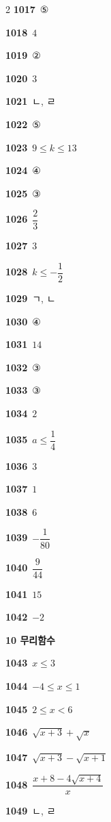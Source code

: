 \documentclass[10pt,a4paper]{article}
\begin{document}
\begin{multicols}{2}
\noindent\textbf{1017}\ ⑤\par
\noindent\textbf{1018}\ $4$\par
\noindent\textbf{1019}\ ②\par
\noindent\textbf{1020}\ $3$\par
\noindent\textbf{1021}\ ㄴ, ㄹ\par
\noindent\textbf{1022}\ ⑤\par
\noindent\textbf{1023}\ $9\le k\le 13$\par
\noindent\textbf{1024}\ ④\par
\noindent\textbf{1025}\ ③\par
\noindent\textbf{1026}\ $\dfrac{2}{3}$\par
\noindent\textbf{1027}\ $3$\par
\noindent\textbf{1028}\ $k\le -\dfrac{1}{2}$\par
\noindent\textbf{1029}\ ㄱ, ㄴ\par
\noindent\textbf{1030}\ ④\par
\noindent\textbf{1031}\ $14$\par
\noindent\textbf{1032}\ ③\par
\noindent\textbf{1033}\ ③\par
\noindent\textbf{1034}\ $2$\par
\noindent\textbf{1035}\ $a\le \dfrac{1}{4}$\par
\noindent\textbf{1036}\ $3$\par
\noindent\textbf{1037}\ $1$\par
\noindent\textbf{1038}\ $6$\par
\noindent\textbf{1039}\ $-\dfrac{1}{80}$\par
\noindent\textbf{1040}\ $\dfrac{9}{44}$\par
\noindent\textbf{1041}\ $15$\par
\noindent\textbf{1042}\ $-2$\par
\noindent\textbf{10 무리함수}\par\smallskip
\noindent\textbf{1043}\ $x\le 3$\par
\noindent\textbf{1044}\ $-4\le x\le 1$\par
\noindent\textbf{1045}\ $2\le x<6$\par
\noindent\textbf{1046}\ $\sqrt{x+3}+\sqrt{x}$\par
\noindent\textbf{1047}\ $\sqrt{x+3}-\sqrt{x+1}$\par
\noindent\textbf{1048}\ $\dfrac{x+8-4\sqrt{x+4}}{x}$\par
\noindent\textbf{1049}\ ㄴ, ㄹ\par

\end{multicols}
\end{document}
